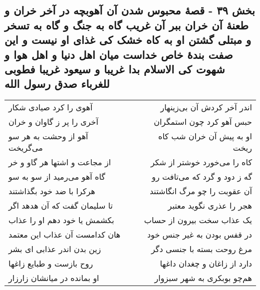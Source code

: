 \begin{center}
\section*{بخش ۳۹ - قصهٔ محبوس شدن آن آهوبچه در آخر خران و طعنهٔ آن خران ببر آن غریب گاه به جنگ و گاه به تسخر و مبتلی گشتن او به کاه خشک کی غذای او نیست و این صفت بندهٔ خاص خداست میان اهل دنیا و اهل هوا  و شهوت کی الاسلام بدا غریبا و سیعود غریبا فطوبی للغرباء  صدق رسول الله}
\label{sec:sh039}
\begin{longtable}{l p{0.5cm} r}
آهوی را کرد صیادی شکار
&&
اندر آخر کردش آن بی‌زینهار
\\
آخری را پر ز گاوان و خران
&&
حبس آهو کرد چون استمگران
\\
آهو از وحشت به هر سو می‌گریخت
&&
او به پیش آن خران شب کاه ریخت
\\
از مجاعت و اشتها هر گاو و خر
&&
کاه را می‌خورد خوشتر از شکر
\\
گاه آهو می‌رمید از سو به سو
&&
گه ز دود و گرد که می‌تافت رو
\\
هرکرا با ضد خود بگذاشتند
&&
آن عقوبت را چو مرگ انگاشتند
\\
تا سلیمان گفت که آن هدهد اگر
&&
هجر را عذری نگوید معتبر
\\
بکشمش یا خود دهم او را عذاب
&&
یک عذاب سخت بیرون از حساب
\\
هان کدامست آن عذاب این معتمد
&&
در قفس بودن به غیر جنس خود
\\
زین بدن اندر عذابی ای بشر
&&
مرغ روحت بسته با جنسی دگر
\\
روح بازست و طبایع زاغها
&&
دارد از زاغان و چغدان داغها
\\
او بمانده در میانشان زارزار
&&
هم‌چو بوبکری به شهر سبزوار
\\
\end{longtable}
\end{center}
